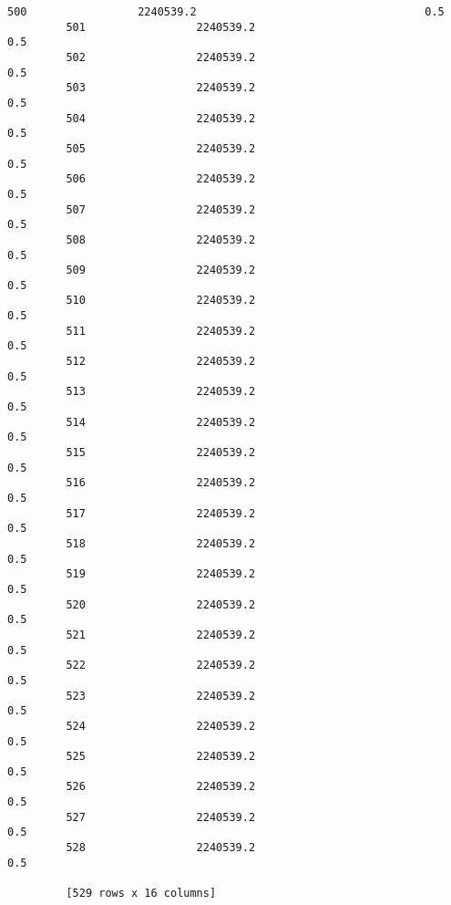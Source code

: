 \documentclass{article}
\begin{document}
\begin{Verbatim}[commandchars=\\\{\}]
         500                 2240539.2                                   0.5  
         501                 2240539.2                                   0.5  
         502                 2240539.2                                   0.5  
         503                 2240539.2                                   0.5  
         504                 2240539.2                                   0.5  
         505                 2240539.2                                   0.5  
         506                 2240539.2                                   0.5  
         507                 2240539.2                                   0.5  
         508                 2240539.2                                   0.5  
         509                 2240539.2                                   0.5  
         510                 2240539.2                                   0.5  
         511                 2240539.2                                   0.5  
         512                 2240539.2                                   0.5  
         513                 2240539.2                                   0.5  
         514                 2240539.2                                   0.5  
         515                 2240539.2                                   0.5  
         516                 2240539.2                                   0.5  
         517                 2240539.2                                   0.5  
         518                 2240539.2                                   0.5  
         519                 2240539.2                                   0.5  
         520                 2240539.2                                   0.5  
         521                 2240539.2                                   0.5  
         522                 2240539.2                                   0.5  
         523                 2240539.2                                   0.5  
         524                 2240539.2                                   0.5  
         525                 2240539.2                                   0.5  
         526                 2240539.2                                   0.5  
         527                 2240539.2                                   0.5  
         528                 2240539.2                                   0.5  
         
         [529 rows x 16 columns]
\end{Verbatim}
        
\end{document}
